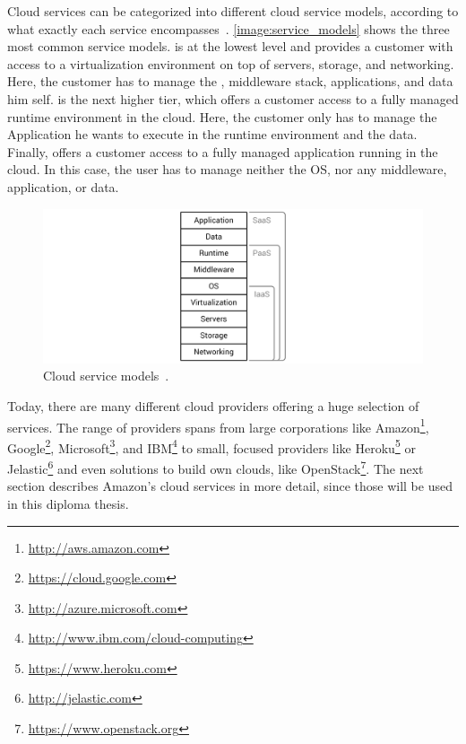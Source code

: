 Cloud services can be categorized into different cloud service models, according to what exactly each service encompasses~\autocite{cloudtaxonomy}.
\autoref{image:service_models} shows the three most common service models.
 is at the lowest level and provides a customer with access to a virtualization environment on top of servers, storage, and networking. Here, the customer has to manage the , middleware stack, applications, and data him self.
 is the next higher tier, which offers a customer access to a fully managed runtime environment in the cloud.
Here, the customer only has to manage the Application he wants to execute in the runtime environment and the data.
Finally,  offers a customer access to a fully managed application running in the cloud.
In this case, the user has to manage neither the OS, nor any middleware, application, or data.

\begin{figure}[!htbp]
	\centering
	\includegraphics[resolution=600]{fundamentals/assets/service_models}
	\caption{Cloud service models~\autocite[based on][]{cloud:def:gabler}.}
	\label{image:service_models}
\end{figure}

Today, there are many different cloud providers offering a huge selection of services.
The range of providers spans from large corporations like Amazon\footnote{\url{http://aws.amazon.com}\label{aws}}, Google\footnote{\url{https://cloud.google.com}}, Microsoft\footnote{\url{http://azure.microsoft.com}}, and IBM\footnote{\url{http://www.ibm.com/cloud-computing}} to small, focused providers like Heroku\footnote{\url{https://www.heroku.com}} or Jelastic\footnote{\url{http://jelastic.com}} and even solutions to build own clouds, like OpenStack\footnote{\url{https://www.openstack.org}}.
The next section describes Amazon's cloud services in more detail, since those will be used in this diploma thesis.

